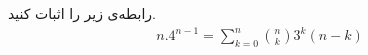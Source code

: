 \documentclass[12pt,onecolumn,a4paper]{article}
\begin{document}
رابطه‌ی زیر را اثبات کنید.
        \begin{align*}
       n. 4^{n-1} = \sum\limits_{k=0}^{n} \binom{n}{k}3^k (n-k) 
        \end{align*}
\end{document}
